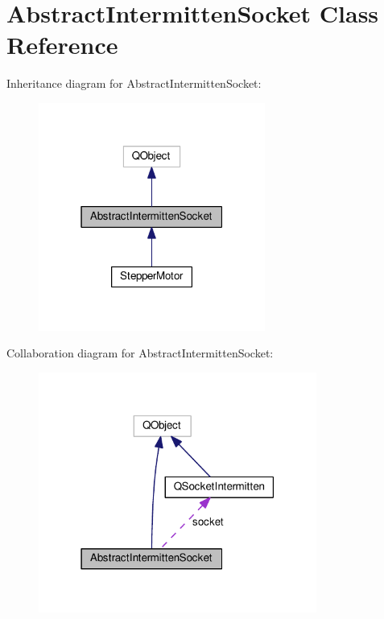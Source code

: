 \hypertarget{class_abstract_intermitten_socket}{}\section{Abstract\+Intermitten\+Socket Class Reference}
\label{class_abstract_intermitten_socket}


Inheritance diagram for Abstract\+Intermitten\+Socket\+:\nopagebreak
\begin{figure}[H]
\begin{center}
\leavevmode
\includegraphics[width=211pt]{class_abstract_intermitten_socket__inherit__graph}
\end{center}
\end{figure}


Collaboration diagram for Abstract\+Intermitten\+Socket\+:\nopagebreak
\begin{figure}[H]
\begin{center}
\leavevmode
\includegraphics[width=259pt]{class_abstract_intermitten_socket__coll__graph}
\end{center}
\end{figure}
